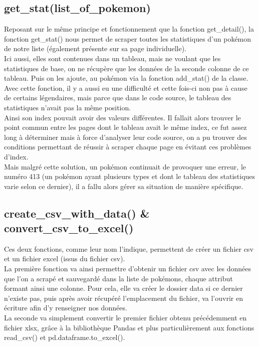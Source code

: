 \documentclass[a4paper, titlepage]{report}
\begin{document}
\subsection*{get\_stat(list\_of\_pokemon)}
\textnormal{Reposant sur le même principe et fonctionnement que la fonction get\_detail(), la fonction get\_stat() nous permet de scraper toutes les statistiques d'un pokémon de notre liste (également présente sur sa page individuelle).\\
Ici aussi, elles sont contenues dans un tableau, mais ne voulant que les statistiques de base, on ne récupère que les données de la seconde colonne de ce tableau. Puis on les ajoute, au pokémon via la fonction add\_stat() de la classe.\\
Avec cette fonction, il y a aussi eu une difficulté et cette fois-ci non pas à cause de certains légendaires, mais parce que dans le code source, le tableau des statistiques n'avait pas la même position.\\
Ainsi son index pouvait avoir des valeurs différentes. Il fallait alors trouver le point commun entre les pages dont le tableau avait le même index, ce fut assez long à déterminer mais à force d'analyser leur code source, on a pu trouver des conditions permettant de réussir à scraper chaque page en évitant ces problèmes d'index.\\
Mais malgré cette solution, un pokémon continuait de provoquer une erreur, le numéro 413 (un pokémon ayant plusieurs types et dont le tableau des statistiques varie selon ce dernier), il a fallu alors gérer sa situation de manière spécifique.}

\subsection*{create\_csv\_with\_data() \& convert\_csv\_to\_excel()}
\textnormal{Ces deux fonctions, comme leur nom l'indique, permettent de créer un fichier csv et un fichier excel (issus du fichier csv).\\
La première fonction va ainsi permettre d'obtenir un fichier csv avec les données que l'on a scrapé et sauvegardé dans la liste de pokémons, chaque attribut formant ainsi une colonne. Pour cela, elle va créer le dossier data si ce dernier n'existe pas, puis après avoir récupéré l'emplacement du fichier, va l'ouvrir en écriture afin d'y renseigner nos données.\\
\newpage
La seconde va simplement convertir le premier fichier obtenu précédemment en fichier xlsx, grâce à la bibliothèque Pandas et plus particulièrement aux fonctions read\_csv() et pd.dataframe.to\_excel().}
\end{document}
